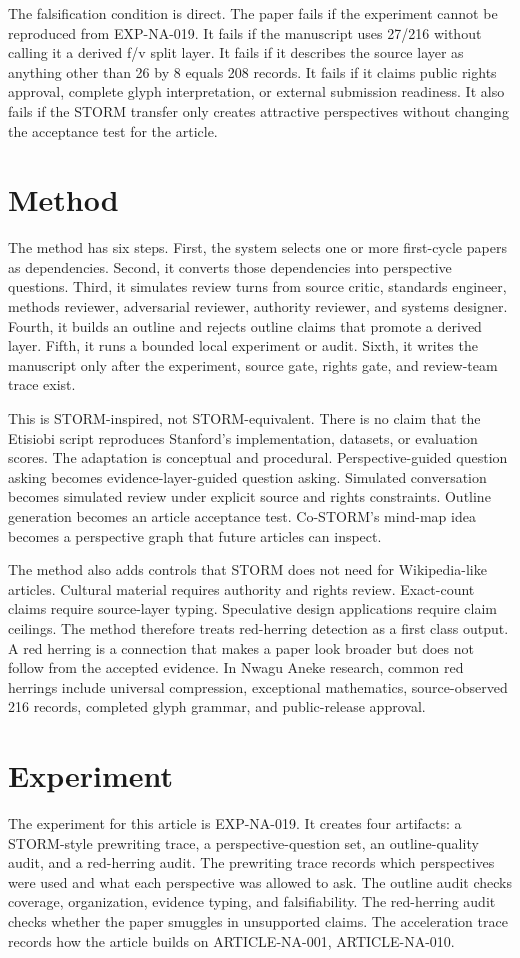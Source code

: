\documentclass[sigconf,nonacm]{acmart}
\begin{document}
The falsification condition is direct. The paper fails if the experiment cannot
be reproduced from EXP-NA-019. It fails if the manuscript uses 27/216 without
calling it a derived f/v split layer. It fails if it describes the source layer
as anything other than 26 by 8 equals 208 records. It fails if it claims public
rights approval, complete glyph interpretation, or external submission readiness.
It also fails if the STORM transfer only creates attractive perspectives without
changing the acceptance test for the article.

\section{Method}
The method has six steps. First, the system selects one or more first-cycle
papers as dependencies. Second, it converts those dependencies into perspective
questions. Third, it simulates review turns from source critic, standards
engineer, methods reviewer, adversarial reviewer, authority reviewer, and
systems designer. Fourth, it builds an outline and rejects outline claims that
promote a derived layer. Fifth, it runs a bounded local experiment or audit.
Sixth, it writes the manuscript only after the experiment, source gate, rights
gate, and review-team trace exist.

This is STORM-inspired, not STORM-equivalent. There is no claim that the
Etisiobi script reproduces Stanford's implementation, datasets, or evaluation
scores. The adaptation is conceptual and procedural. Perspective-guided question
asking becomes evidence-layer-guided question asking. Simulated conversation
becomes simulated review under explicit source and rights constraints. Outline
generation becomes an article acceptance test. Co-STORM's mind-map idea becomes
a perspective graph that future articles can inspect.

The method also adds controls that STORM does not need for Wikipedia-like
articles. Cultural material requires authority and rights review. Exact-count
claims require source-layer typing. Speculative design applications require
claim ceilings. The method therefore treats red-herring detection as a first
class output. A red herring is a connection that makes a paper look broader but
does not follow from the accepted evidence. In Nwagu Aneke research, common red
herrings include universal compression, exceptional mathematics, source-observed
216 records, completed glyph grammar, and public-release approval.

\section{Experiment}
The experiment for this article is EXP-NA-019. It creates four artifacts: a
STORM-style prewriting trace, a perspective-question set, an outline-quality
audit, and a red-herring audit. The prewriting trace records which perspectives
were used and what each perspective was allowed to ask. The outline audit checks
coverage, organization, evidence typing, and falsifiability. The red-herring
audit checks whether the paper smuggles in unsupported claims. The acceleration
trace records how the article builds on ARTICLE-NA-001, ARTICLE-NA-010.
\end{document}
